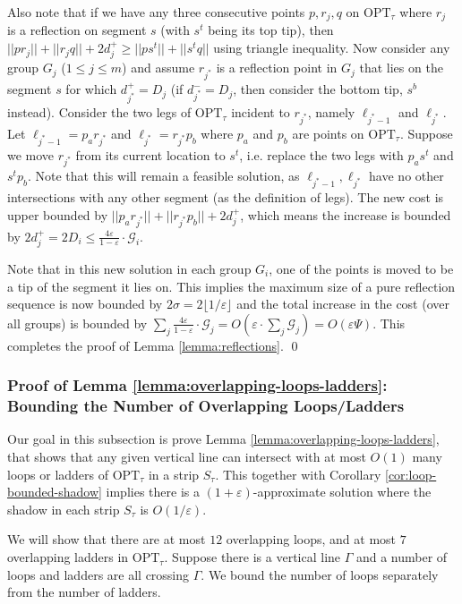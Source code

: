 \documentclass[10pt,a4paper]{amsart}
\theoremstyle{thmstyleone}
\newcommand{\eps}{\varepsilon}
\newcommand{\OPT}{{\text{OPT}}}
\begin{document}
Also note that if we have any three consecutive points $p,r_j,q$ on $\OPT_\tau$ where $r_j$ is a reflection on segment $s$ (with $s^t$ being its top tip), then $||p r_j||+||r_j q||+ 2d^+_j\geq ||p s^t||+||s^t q||$ using triangle inequality. Now consider any group $G_j$ ($1\leq j\leq m$) and assume $r_{j^*}$
is a reflection point in $G_j$ that lies on the segment $s$ for which $d^+_{j^*}=D_j$ (if $d^-_{j^*} = D_j$, then consider the bottom tip, $s^b$ instead). Consider the two legs of $\OPT_\tau$ incident to $r_{j^*}$,  namely
$\ell_{j^*-1}$ and $\ell_{j^*}$. Let $\ell_{j^* - 1} = p_{a}r_{j^*}$ and $\ell_{j^*} = r_{j^*}p_{b}$ where $p_a$ and $p_b$ are points on $\OPT_\tau$. Suppose we move $r_{j^*}$ from its current location to $s^t$, i.e. replace the two legs with $p_as^t$ and $s^t p_b$. Note that this will remain a feasible solution, as $\ell_{j^*-1},\ell_{j^*}$ have no other intersections with any other segment (as the definition of legs). The new cost is upper bounded by $||p_a r_{j^*}||+||r_{j^*} p_b||+2d^+_j$,
which means the increase is bounded by $2d^+_j=2D_i \le \frac{4\eps}{1 - \eps}\cdot\mathcal G_i$.

Note that in this new solution in each group $G_i$, one of the points is moved to be a tip of the segment it lies on. This implies the maximum size of a pure reflection sequence is now bounded by $2\sigma = 2\lfloor 1/\eps \rfloor$ and the 
total increase in the cost (over all groups) is bounded by $\sum_{j}\frac{4\eps}{1-\eps}\cdot \mathcal G_j = O(\eps\cdot \sum_j\mathcal G_j)=O(\eps\Psi)$.
This completes the proof of Lemma \ref{lemma:reflections}. \qed

\subsubsection{Proof of Lemma \ref{lemma:overlapping-loops-ladders}: Bounding the Number of Overlapping Loops/Ladders}\label{sec:lemma-overlapping-loops/ladders}

Our goal in this subsection is prove Lemma \ref{lemma:overlapping-loops-ladders}, that shows that any given vertical line can intersect with at most $O(1)$ many loops or ladders of
$\OPT_\tau$ in a strip $S_\tau$. This together with Corollary \ref{cor:loop-bounded-shadow} implies there is a $(1+\eps)$-approximate solution where the shadow in each strip $S_\tau$ is $O(1/\eps)$.

We will show that there are at most $12$ overlapping loops, and at most $7$ overlapping ladders in $ \OPT_\tau $. 
    Suppose there is a vertical line $\Gamma$ and a number of loops and ladders are all crossing $\Gamma$.
    We bound the number of loops separately from the number of ladders.
    
\end{document}
